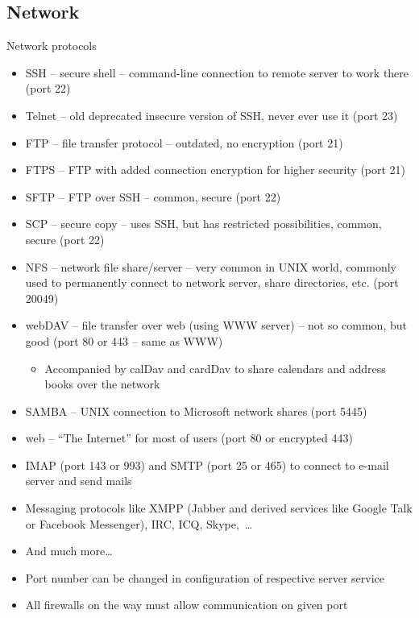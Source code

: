 \documentclass[compress, ucs, xelatex, 11pt, xcolor=svgnames,
  hyperref={
    bookmarks=true,
    unicode=true,
    colorlinks=true,
    pdftitle={Linux, command line and MetaCentrum},
    plainpages=false,
    pdfauthor={Vojtech Zeisek},
    pdfsubject={Course about use of Linux command line, writing shell scripts and using MetaCentrum of CESNET},
    pdfcreator={XeLaTeX},
    pdfkeywords={Linux, GNU, BASH, shell, command line, MetaCentrum},
    linkcolor=DarkRed,
    anchorcolor=DarkBlue,
    citecolor=Indigo,
    filecolor=NavyBlue,
    menucolor=DarkMagenta,
    urlcolor=DarkBlue,
    pdftex},
  url={hyphens, lowtilde} %
  ]{beamer}
\begin{document}
\subsection{Network}

\begin{frame}[allowframebreaks]{Network protocols}
  \begin{itemize}
    \item SSH -- secure shell -- command-line connection to remote server to work there (port 22)
    \item Telnet -- old deprecated insecure version of SSH, never ever use it (port 23)
    \item FTP -- file transfer protocol -- outdated, no encryption (port 21)
    \item FTPS -- FTP with added connection encryption for higher security (port 21)
    \item SFTP -- FTP over SSH -- common, secure (port 22)
    \item SCP -- secure copy -- uses SSH, but has restricted possibilities, common, secure (port 22)
    \item NFS -- network file share/server -- very common in UNIX world, commonly used to permanently connect to network server, share directories, etc. (port 20049)
    \item webDAV -- file transfer over web (using WWW server) -- not so common, but good (port 80 or 443 -- same as WWW)
    \begin{itemize}
      \item Accompanied by calDav and cardDav to share calendars and address books over the network
    \end{itemize}
    \item SAMBA -- UNIX connection to Microsoft network shares (port 5445)
    \item web -- ``The Internet'' for most of users (port 80 or encrypted 443)
    \item IMAP (port 143 or 993) and SMTP (port 25 or 465) to connect to e-mail server and send mails
    \item Messaging protocols like XMPP (Jabber and derived services like Google Talk or Facebook Messenger), IRC, ICQ, Skype,~\ldots
    \item And much more\ldots
    \item Port number can be changed in configuration of respective server service
    \item All firewalls on the way must allow communication on given port
  \end{itemize}
\end{frame}
\end{document}
